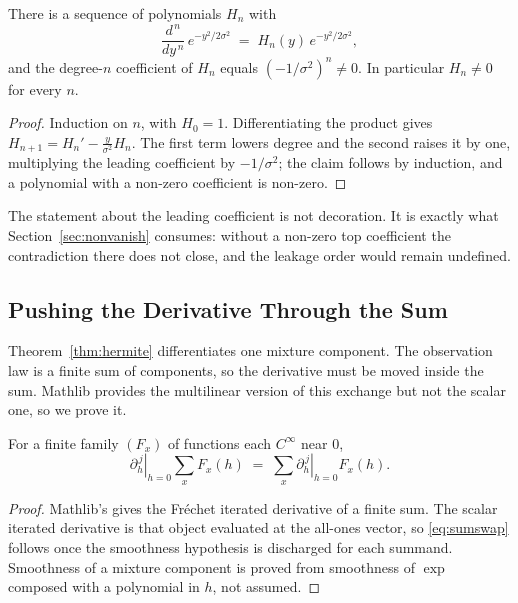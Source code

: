 \begin{theorem}
\label{thm:hermite}
There is a sequence of polynomials $H_{n}$ with
\begin{equation}
\frac{d^{\,n}}{dy^{\,n}}\,e^{-y^{2}/2\sigma^{2}}
   \;=\;H_{n}(y)\,e^{-y^{2}/2\sigma^{2}},
\label{eq:hermite}
\end{equation}
and the degree-$n$ coefficient of $H_{n}$ equals $(-1/\sigma^{2})^{n}\neq0$. In particular
$H_{n}\neq0$ for every $n$.
\end{theorem}

\begin{proof}
Induction on $n$, with $H_{0}=1$. Differentiating the product gives
$H_{n+1}=H_{n}'-\tfrac{y}{\sigma^{2}}H_{n}$. The first term lowers degree and the second
raises it by one, multiplying the leading coefficient by $-1/\sigma^{2}$; the claim follows
by induction, and a polynomial with a non-zero coefficient is non-zero.
\end{proof}


The statement about the leading coefficient is not decoration. It is exactly what
Section~\ref{sec:nonvanish} consumes: without a non-zero top coefficient the contradiction
there does not close, and the leakage order would remain undefined.

\subsection{Pushing the Derivative Through the Sum}
\label{sec:assembly}

Theorem~\ref{thm:hermite} differentiates one mixture component. The observation law is a
finite sum of components, so the derivative must be moved inside the sum. Mathlib provides
the multilinear version of this exchange but not the scalar one, so we prove it.

\begin{theorem}
\label{thm:sumswap}
For a finite family $(F_{x})$ of functions each $C^{\infty}$ near $0$,
\begin{equation}
\left.\partial_{h}^{\,j}\right|_{h=0}\sum_{x}F_{x}(h)
   \;=\;\sum_{x}\left.\partial_{h}^{\,j}\right|_{h=0}F_{x}(h).
\label{eq:sumswap}
\end{equation}
\end{theorem}

\begin{proof}
Mathlib's  gives the Fréchet iterated derivative of a
finite sum. The scalar iterated derivative is that object evaluated at the all-ones vector,
so \eqref{eq:sumswap} follows once the smoothness hypothesis is discharged for each summand.
Smoothness of a mixture component is proved from smoothness of $\exp$ composed with a
polynomial in $h$, not assumed.
\end{proof}

